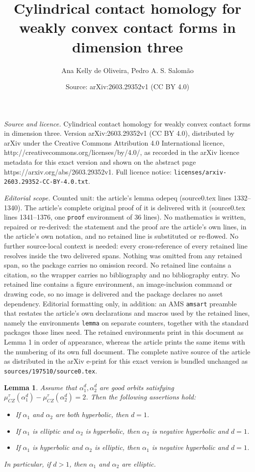 \documentclass[10pt,a4paper]{amsart}
\title{Cylindrical contact homology for weakly convex contact forms in dimension three}
\author{Ana Kelly de Oliveira, Pedro A. S. Salom\~ao}
\date{Source: arXiv:2603.29352v1 (CC BY 4.0)}
\newtheorem{lemma}{Lemma}
\newcommand{\CZ}{\mu_{CZ}^{\tau}}
\begin{document}
\maketitle

\noindent\emph{Source and licence.} Cylindrical contact homology for weakly convex contact forms in dimension three. Version arXiv:2603.29352v1 (CC BY 4.0), distributed by arXiv under the Creative Commons Attribution 4.0 International licence, http://creativecommons.org/licenses/by/4.0/, as recorded in the arXiv licence metadata for this exact version and shown on the abstract page https://arxiv.org/abs/2603.29352v1. Full licence notice: \texttt{licenses/arxiv-2603.29352-CC-BY-4.0.txt}.\par\smallskip

\noindent\textit{Editorial scope.} Counted unit: the article's lemma odepeq (source0.tex lines 1332--1340). The article's complete original proof of it is delivered with it (source0.tex lines 1341--1376, one \texttt{proof} environment of 36 lines). No mathematics is written, repaired or re-derived: the statement and the proof are the article's own lines, in the article's own notation, and no retained line is substituted or re-flowed.  No further source-local context is needed: every cross-reference of every retained line resolves inside the two delivered spans.  Nothing was omitted from any retained span, so the package carries no omission record.  No retained line contains a citation, so the wrapper carries no bibliography and no bibliography entry.  No retained line contains a figure environment, an image-inclusion command or drawing code, so no image is delivered and the package declares no asset dependency.  Editorial formatting only, in addition: an AMS \texttt{amsart} preamble that restates the article's own declarations and macros used by the retained lines, namely the environments \texttt{lemma} on separate counters, together with the standard packages those lines need.  The retained environments print in this document as Lemma 1 in order of appearance, whereas the article prints the same items with the numbering of its own full document.  The complete native source of the article as distributed in the arXiv e-print for this exact version is bundled unchanged as \texttt{sources/197510/source0.tex}.
\begin{lemma}\label{odepeq}
Assume that $\alpha_1^d, \alpha_2^d$ are good orbits satisfying $\CZ(\alpha_1^d)-\CZ(\alpha_2^d)=2$. Then the following assertions hold:
\begin{itemize}
    \item[(i)] If $\alpha_1$ and $\alpha_2$ are both hyperbolic, then $d=1$.
    \item[(ii)] If $\alpha_1$ is elliptic and $\alpha_2$ is hyperbolic, then $\alpha_2$ is negative hyperbolic and $d=1$.
    \item[(iii)] If $\alpha_1$ is hyperbolic and $\alpha_2$ is elliptic, then $\alpha_1$ is negative hyperbolic and $d=1$.
\end{itemize}
In particular, if $d>1$, then $\alpha_1$ and $\alpha_2$ are elliptic.
\end{lemma}
\end{document}
